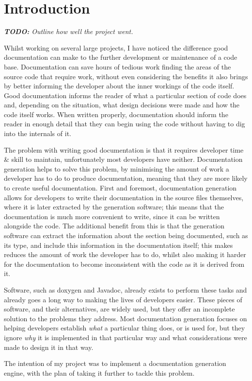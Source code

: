 
\chapter{Introduction}

\emph{\textbf{TODO:} Outline how well the project went.}

Whilst working on several large projects, I have noticed the difference good
documentation can make to the further development or maintenance of a code base.
Documentation can save hours of tedious work finding the areas of the source
code that require work, without even considering the benefits it also brings by
better informing the developer about the inner workings of the code itself. Good
documentation informs the reader of what a particular section of code does and,
depending on the situation, what design decisions were made and how the code
itself works. When written properly, documentation should inform the reader in
enough detail that they can begin using the code without having to dig into the
internals of it.

The problem with writing good documentation is that it requires developer time
\& skill to maintain, unfortunately most developers have neither. Documentation
generation helps to solve this problem, by minimising the amount of work a
developer has to do to produce documentation, meaning that they are more likely
to create useful documentation. First and foremost, documentation generation
allows for developers to write their documentation in the source files
themselves, where it is later extracted by the generation software; this means
that the documentation is much more convenient to write, since it can be written
alongside the code. The additional benefit from this is that the generation
software can extract the information about the section being documented, such as
its type, and include this information in the documentation itself; this makes
reduces the amount of work the developer has to do, whilst also making it harder
for the documentation to become inconsistent with the code as it is derived from
it.

Software, such as doxygen\cite{website:doxygen} and
Javadoc\cite{website:javadoc}, already exists to perform these tasks and already
goes a long way to making the lives of developers easier. These pieces of
software, and their alternatives, are widely used, but they offer an incomplete
solution to the problems they address. Most documentation generation focuses on
helping developers establish \emph{what} a particular thing does, or is used
for, but they ignore \emph{why} it is implemented in that particular way and
what considerations were made to design it in that way.

The intention of my project was to implement a documentation generation engine,
with the plan of taking it further to tackle this problem.
